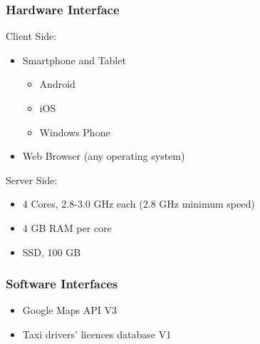 \documentclass[a4paper]{article}
\begin{document}
\subsubsection{Hardware Interface}
Client Side:
\begin{itemize}
\item Smartphone and Tablet
    \begin{itemize}
    \item Android
    \item iOS
    \item Windows Phone
    \end{itemize}
\item \begin{samepage} Web Browser (any operating system)
         \end{samepage}
\end{itemize}

Server Side:
\begin{itemize}
\item 4 Cores, 2.8-3.0 GHz each (2.8 GHz minimum speed)
\item 4 GB RAM per core
\item SSD, 100 GB
\end{itemize}

\subsubsection{Software Interfaces}
\begin{itemize}
\item Google Maps API V3
\item Taxi drivers' licences database V1
\end{itemize}
\end{document}
